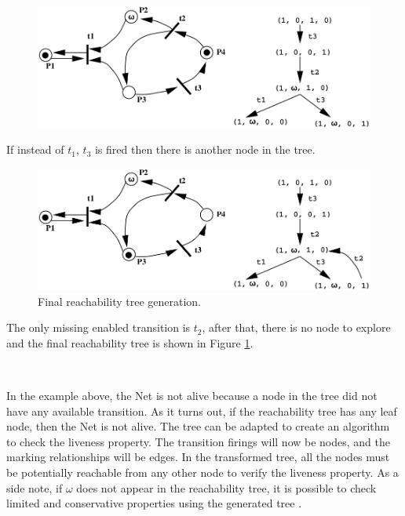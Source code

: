 \documentclass[12pt,english]{article} %
\begin{document}
\begin{figure}[H]
    \centering
    \includegraphics[scale=0.45]{img/petri-net/reachability-tree-example/reachability-tree-step5.png}
\end{figure}
If instead of $t_1$, $t_3$ is fired then there is another node in the tree.

\begin{figure}[H]
    \centering
    \includegraphics[scale=0.45]{img/petri-net/reachability-tree-example/reachability-tree-stepn.png}
    \caption{Final reachability tree generation.}
    \label{fig:reachability-tree-stepn}
\end{figure}
The only missing enabled transition is $t_2$, after that, there is no node to explore and the final reachability tree is shown in Figure \ref{fig:reachability-tree-stepn}.

\ 

In the example above, the Net is not alive because a node in the tree did not have any available transition.
As it turns out, if the reachability tree has any leaf node, then the Net is not alive.
The tree can be adapted to create an algorithm to check the liveness property.
The transition firings will now be nodes, and the marking relationships will be edges.
In the transformed tree, all the nodes must be potentially reachable from any other node to verify the liveness property.
As a side note, if $\omega$ does not appear in the reachability tree, it is possible to check limited and conservative properties using the generated tree \cite{lecture-notes-concurrent-systems-validation}.
\end{document}
